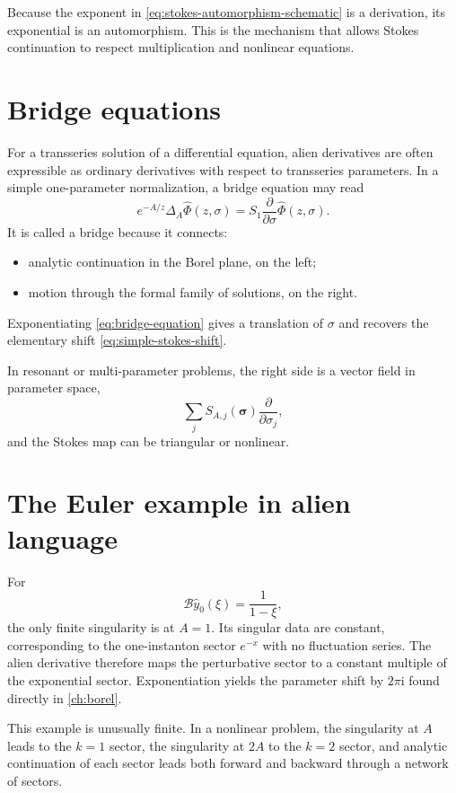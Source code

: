 \documentclass[11pt,openany]{book}
\theoremstyle{definition}
\theoremstyle{plain}
\theoremstyle{remark}
\newcommand{\ii}{\mathrm{i}}
\newcommand{\trans}[1]{\widehat{#1}}
\newcommand{\Borel}{\mathcal{B}}
\newcommand{\alien}{\Delta}
\begin{document}
Because the exponent in \eqref{eq:stokes-automorphism-schematic} is a derivation, its exponential is an automorphism. This is the mechanism that allows Stokes continuation to respect multiplication and nonlinear equations.

\section{Bridge equations}

For a transseries solution of a differential equation, alien derivatives are often expressible as ordinary derivatives with respect to transseries parameters. In a simple one-parameter normalization, a bridge equation may read
\begin{equation}\label{eq:bridge-equation}
 e^{-A/z}\alien_A\trans\Phi(z,\sigma)
 =S_1\frac{\partial}{\partial\sigma}
 \trans\Phi(z,\sigma).
\end{equation}
It is called a bridge because it connects:
\begin{itemize}
 \item analytic continuation in the Borel plane, on the left;
 \item motion through the formal family of solutions, on the right.
\end{itemize}
Exponentiating \eqref{eq:bridge-equation} gives a translation of $\sigma$ and recovers the elementary shift \eqref{eq:simple-stokes-shift}.

In resonant or multi-parameter problems, the right side is a vector field in parameter space,
\[
 \sum_j S_{A,j}(\boldsymbol\sigma)
 \frac{\partial}{\partial\sigma_j},
\]
and the Stokes map can be triangular or nonlinear.

\section{The Euler example in alien language}

For
\[
 \Borel\trans y_0(\xi)=\frac1{1-\xi},
\]
the only finite singularity is at $A=1$. Its singular data are constant, corresponding to the one-instanton sector $e^{-x}$ with no fluctuation series. The alien derivative therefore maps the perturbative sector to a constant multiple of the exponential sector. Exponentiation yields the parameter shift by $2\pi\ii$ found directly in \cref{ch:borel}.

This example is unusually finite. In a nonlinear problem, the singularity at $A$ leads to the $k=1$ sector, the singularity at $2A$ to the $k=2$ sector, and analytic continuation of each sector leads both forward and backward through a network of sectors.
\end{document}
